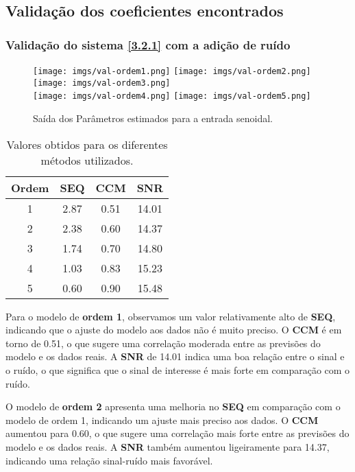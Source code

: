\documentclass[a4paper,12pt]{article}
\begin{document}
\subsection{Validação dos coeficientes encontrados}\label{4.6}

\subsubsection{Validação do sistema \ref{3.2.1} com a adição de ruído}

\begin{figure}[h!]
\centering

\texttt{[image: imgs/val-ordem1.png]} \quad
\texttt{[image: imgs/val-ordem2.png]} \quad
\texttt{[image: imgs/val-ordem3.png]} \\

\texttt{[image: imgs/val-ordem4.png]} \quad
\texttt{[image: imgs/val-ordem5.png]}

\caption{Saída dos Parâmetros estimados para a entrada senoidal.} \label{fig6}
\end{figure}

\begin{table}[h!]
    \centering
    \begin{tabular}{|c|c|c|c|}
        \hline
        \textbf{Ordem} & \textbf{SEQ} & \textbf{CCM} & \textbf{SNR} \\
        \hline
        1 & 2.87 & 0.51 & 14.01 \\ 
        2 & 2.38 & 0.60 & 14.37 \\ 
        3 & 1.74 & 0.70 & 14.80 \\ 
        4 & 1.03 & 0.83 & 15.23 \\ 
        5 & 0.60 & 0.90 & 15.48 \\ 
        \hline
    \end{tabular}
    \caption{Valores obtidos para os diferentes métodos utilizados.}
\end{table}

Para o modelo de \textbf{ordem 1}, observamos um valor relativamente alto de \textbf{SEQ}, indicando que o ajuste do modelo aos dados não é muito preciso. O \textbf{CCM} é em torno de 0.51, o que sugere uma correlação moderada entre as previsões do modelo e os dados reais. A \textbf{SNR} de 14.01 indica uma boa relação entre o sinal e o ruído, o que significa que o sinal de interesse é mais forte em comparação com o ruído.

O modelo de \textbf{ordem 2} apresenta uma melhoria no \textbf{SEQ} em comparação com o modelo de ordem 1, indicando um ajuste mais preciso aos dados. O \textbf{CCM} aumentou para 0.60, o que sugere uma correlação mais forte entre as previsões do modelo e os dados reais. A \textbf{SNR} também aumentou ligeiramente para 14.37, indicando uma relação sinal-ruído mais favorável.
\end{document}
